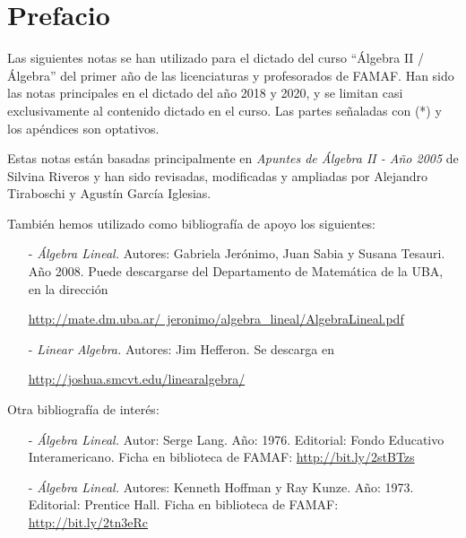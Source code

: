 \documentclass[a4paper,12pt,twoside,spanish,reqno]{amsbook}
\numberwithin{equation}{section}
\theoremstyle{definition}
\theoremstyle{remark}
\begin{document}
    \tableofcontents 
    
    
    \chapter*{Prefacio} 

    
    Las siguientes notas se han utilizado para el dictado del curso ``Álgebra II / Álgebra'' del primer año de las licenciaturas y profesorados de FAMAF. 	Han sido las notas principales en el dictado del año 2018 y 2020, y se limitan casi exclusivamente al contenido dictado en el curso. Las partes señaladas con (*) y los apéndices son optativos.
    
    Estas notas están basadas principalmente en \textit{Apuntes de Álgebra II - Año 2005} de Silvina Riveros y han sido revisadas, modificadas y ampliadas por Alejandro Tiraboschi  y Agustín García Iglesias. 
    
    También hemos utilizado como bibliografía de apoyo  los siguientes: 
    
    \begin{enumerate}
        \item [-] \textit{Álgebra Lineal.} Autores: Gabriela Jerónimo, Juan Sabia y Susana Tesauri. Año 2008. Puede descargarse del Departamento de Matemática de la UBA, en la dirección
        
        \href{http://mate.dm.uba.ar/~jeronimo/algebra_lineal/AlgebraLineal.pdf}	 {http://mate.dm.uba.ar/~jeronimo/algebra\_lineal/AlgebraLineal.pdf}
        \item [- ] \textit{Linear Algebra.} Autores: Jim Hefferon. Se descarga en
        
        \href{http://joshua.smcvt.edu/linearalgebra/}{http://joshua.smcvt.edu/linearalgebra/}
    \end{enumerate}
    
    
    Otra bibliografía de interés:
        \begin{enumerate}
            \item [-] \textit{Álgebra Lineal.}  Autor: Serge Lang. Año: 1976. Editorial: Fondo Educativo Interamericano. Ficha en biblioteca de FAMAF: \href{http://bit.ly/2stBTzs}{http://bit.ly/2stBTzs}
            \item [-] \textit{Álgebra Lineal.} Autores: Kenneth Hoffman y Ray Kunze.  Año: 1973. Editorial: Prentice Hall. Ficha en biblioteca de FAMAF:  \href{http://bit.ly/2tn3eRc}{http://bit.ly/2tn3eRc}
        \end{enumerate}
    
\end{document}
